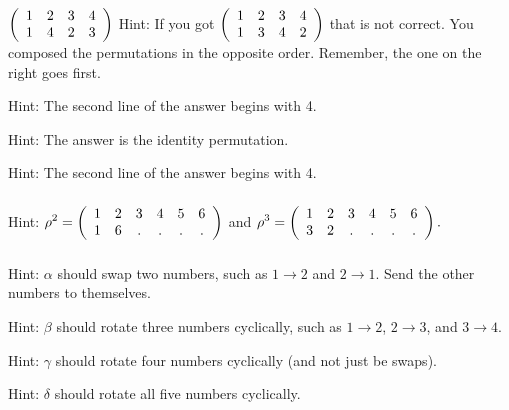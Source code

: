 \subsubsection*{ \answers}
\begin{apart}
    \item $\displaystyle \left ( \begin{array} {ccc c} 1 & 2 & 3 & 4 \\ 1 & 4 & 2 & 3\\ \end{array} \right )$  Hint: If you got $\displaystyle \left ( \begin{array} {ccc c} 1 & 2 & 3 & 4 \\ 1 & 3 & 4 & 2\\ \end{array} \right )$  that is not correct.  You composed the permutations in the opposite order.  Remember, the one on the right goes first.
    \item Hint: The second line of the answer begins with 4.
    \item Hint: The answer is the identity permutation.
    \item Hint: The second line of the answer begins with 4.
\end{apart}

\subsubsection*{ \answers}
Hint: $\displaystyle \rho^2 = \left ( \begin{array} {ccc ccc} 1 & 2 & 3 & 4 & 5 & 6 \\ 1 & 6 & . & . & . & .\\ \end{array} \right )$
and $\displaystyle \rho^3 = \left ( \begin{array} {ccc ccc} 1 & 2 & 3 & 4 & 5 & 6 \\ 3 & 2 &  . & . & . & . \\ \end{array} \right ).$

\subsubsection*{ \answers}
\begin{apart}
    \item Hint: $\alpha$ should swap two numbers, such as $1 \to 2$ and $2 \to 1$.  Send the other numbers to themselves.
    \item Hint: $\beta$ should rotate three numbers cyclically, such as $1 \to 2$, $2 \to 3$, and $3 \to 4$.
    \item Hint: $\gamma$ should rotate four numbers cyclically (and not just be swaps).
    \item Hint: $\delta$ should rotate all five numbers cyclically.
\end{apart}

